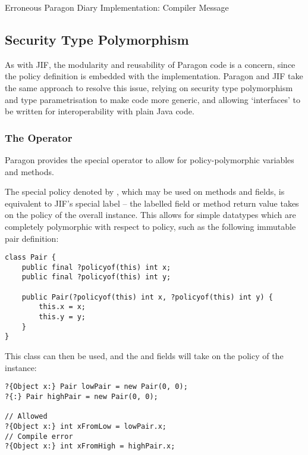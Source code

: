 \begin{listing}[!ht]
	\inputminted[fontsize=\footnotesize]{text}{content/code_sections/jif_para_bg/DiaryError_message_para.txt}
	\caption{Erroneous Paragon Diary Implementation: Compiler Message}
	\label{lst_diary_para_error_message}
\end{listing}



\subsection{Security Type Polymorphism} \label{para_generics}

As with JIF, the modularity and reusability of Paragon code is a concern, since the policy definition is embedded with the implementation. Paragon and JIF take the same approach to resolve this issue, relying on security type polymorphism and type parametrisation to make code more generic, and allowing `interfaces' to be written for interoperability with plain Java code.

\subsubsection{The  Operator}

Paragon provides the special  operator to allow for policy-polymorphic variables and methods.

The special policy denoted by , which may be used on methods and  fields, is equivalent to JIF's special  label -- the labelled field or method return value takes on the policy of the overall instance. This allows for simple datatypes which are completely polymorphic with respect to policy, such as the following immutable pair definition:

\begin{verbatim}
class Pair {
	public final ?policyof(this) int x;
	public final ?policyof(this) int y;
	
	public Pair(?policyof(this) int x, ?policyof(this) int y) {
		this.x = x;
		this.y = y;
	} 
}
\end{verbatim}

This class can then be used, and the  and  fields will take on the policy of the instance:

\begin{verbatim}
?{Object x:} Pair lowPair = new Pair(0, 0);
?{:} Pair highPair = new Pair(0, 0);

// Allowed
?{Object x:} int xFromLow = lowPair.x;
// Compile error
?{Object x:} int xFromHigh = highPair.x;
\end{verbatim}


